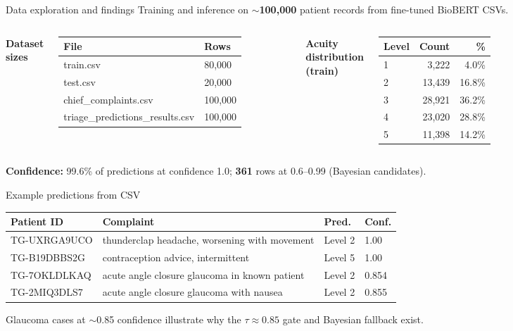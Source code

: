 \begin{frame}{Data exploration and findings}
  Training and inference on \textbf{$\sim$100,000} patient records from fine-tuned BioBERT CSVs.

  \footnotesize
  \begin{columns}[T]
    \textbf{Dataset sizes}
    \begin{tabular}{@{}ll@{}}
      \toprule
      File & Rows \\
      \midrule
      train.csv & 80,000 \\
      test.csv & 20,000 \\
      chief\_complaints.csv & 100,000 \\
      triage\_predictions\_results.csv & 100,000 \\
      \bottomrule
    \end{tabular}

    \textbf{Acuity distribution (train)}
    \begin{tabular}{@{}lrr@{}}
      \toprule
      Level & Count & \% \\
      \midrule
      1 & 3,222 & 4.0\% \\
      2 & 13,439 & 16.8\% \\
      3 & 28,921 & 36.2\% \\
      4 & 23,020 & 28.8\% \\
      5 & 11,398 & 14.2\% \\
      \bottomrule
    \end{tabular}
  \end{columns}

  \vspace{0.4em}
  \textbf{Confidence:} 99.6\% of predictions at confidence 1.0; \textbf{361} rows at 0.6--0.99 (Bayesian candidates).

\end{frame}

\begin{frame}{Example predictions from CSV}
  \footnotesize
  \begin{tabular}{@{}p{2.2cm}p{4.5cm}ll@{}}
    \toprule
    \textbf{Patient ID} & \textbf{Complaint} & \textbf{Pred.} & \textbf{Conf.} \\
    \midrule
    TG-UXRGA9UCO & thunderclap headache, worsening with movement & Level 2 & 1.00 \\
    TG-B19DBBS2G & contraception advice, intermittent & Level 5 & 1.00 \\
    TG-7OKLDLKAQ & acute angle closure glaucoma in known patient & Level 2 & 0.854 \\
    TG-2MIQ3DLS7 & acute angle closure glaucoma with nausea & Level 2 & 0.855 \\
    \bottomrule
  \end{tabular}

  \vspace{0.5em}
  \normalsize
  Glaucoma cases at $\sim$0.85 confidence illustrate why the $\tau \approx 0.85$ gate and Bayesian fallback exist.
\end{frame}
